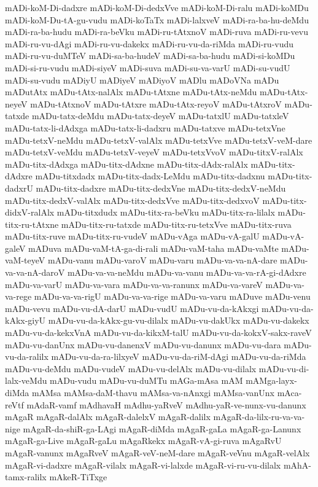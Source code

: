 {mADi-koM-Di-dadxre
mADi-koM-Di-dedxVve
mADi-koM-Di-ralu
mADi-koMDu
mADi-koM-Du-tA-gu-vudu
mADi-koTaTx
mADi-lalxveV
mADi-ra-ba-hu-deMdu
mADi-ra-ba-hudu
mADi-ra-beVku
mADi-ru-tAtxnoV
mADi-ruva
mADi-ru-vevu
mADi-ru-vu-dAgi
mADi-ru-vu-dakekx
mADi-ru-vu-da-riMda
mADi-ru-vudu
mADi-ru-vu-duMTeV
mADi-sa-ba-hudeV
mADi-sa-ba-hudu
mADi-si-koMDu
mADi-si-ru-vudu
mADi-siyeV
mADi-suva
mADi-su-va-varU
mADi-su-vudU
mADi-su-vudu
mADiyU
mADiyeV
mADiyoV
mADlu
mADoVNa
mADu
mADutAtx
mADu-tAtx-nalAlx
mADu-tAtxne
mADu-tAtx-neMdu
mADu-tAtx-neyeV
mADu-tAtxnoV
mADu-tAtxre
mADu-tAtx-reyoV
mADu-tAtxroV
mADu-tatxde
mADu-tatx-deMdu
mADu-tatx-deyeV
mADu-tatxlU
mADu-tatxleV
mADu-tatx-li-dAdxga
mADu-tatx-li-dadxru
mADu-tatxve
mADu-tetxVne
mADu-tetxV-neMdu
mADu-tetxV-valAlx
mADu-tetxVve
mADu-tetxV-veM-dare
mADu-tetxV-veMdu
mADu-tetxV-veyeV
mADu-tetxVvoV
mADu-titxV-ralAlx
mADu-titx-dAdxga
mADu-titx-dAdxne
mADu-titx-dAdx-ralAlx
mADu-titx-dAdxre
mADu-titxdadx
mADu-titx-dadx-LeMdu
mADu-titx-dadxnu
mADu-titx-dadxrU
mADu-titx-dadxre
mADu-titx-dedxVne
mADu-titx-dedxV-neMdu
mADu-titx-dedxV-valAlx
mADu-titx-dedxVve
mADu-titx-dedxvoV
mADu-titx-didxV-ralAlx
mADu-titxdudx
mADu-titx-ra-beVku
mADu-titx-ra-lilalx
mADu-titx-ru-tAtxne
mADu-titx-ru-tatxde
mADu-titx-ru-tetxVve
mADu-titx-ruva
mADu-titx-ruve
mADu-titx-ru-vudeV
mADu-vAga
mADu-vA-galU
mADu-vA-galeV
mADuva
mADu-vaM-tA-ga-di-rali
mADu-vaM-taha
mADu-vaMte
mADu-vaM-teyeV
mADu-vanu
mADu-varoV
mADu-varu
mADu-va-va-nA-dare
mADu-va-va-nA-daroV
mADu-va-va-neMdu
mADu-va-vanu
mADu-va-va-rA-gi-dAdxre
mADu-va-varU
mADu-va-vara
mADu-va-va-ranunx
mADu-va-vareV
mADu-va-va-rege
mADu-va-va-rigU
mADu-va-va-rige
mADu-va-varu
mADuve
mADu-venu
mADu-vevu
mADu-vu-dA-darU
mADu-vudU
mADu-vu-da-kAkxgi
mADu-vu-da-kAkx-giyU
mADu-vu-da-kAkx-gu-vu-dilalx
mADu-vu-dakUkx
mADu-vu-dakekx
mADu-vu-da-kekxVnA
mADu-vu-da-kikxM-talU
mADu-vu-da-kokxV-sakx-raveV
mADu-vu-danUnx
mADu-vu-danenxV
mADu-vu-danunx
mADu-vu-dara
mADu-vu-da-ralilx
mADu-vu-da-ra-lilxyeV
mADu-vu-da-riM-dAgi
mADu-vu-da-riMda
mADu-vu-deMdu
mADu-vudeV
mADu-vu-delAlx
mADu-vu-dilalx
mADu-vu-di-lalx-veMdu
mADu-vudu
mADu-vu-duMTu
mAGa-mAsa
mAM
mAMga-layx-diMda
mAMsa
mAMsa-daM-thavu
mAMsa-va-nAnxgi
mAMsa-vanUnx
mAca-reVtf
mAdaR-vamf
mAdhavaH
mAdhu-yaRveV
mAdhu-yaR-ve-nunx-vu-danunx
mAgaR
mAgaR-dalAlx
mAgaR-dalelxV
mAgaR-dalilx
mAgaR-da-lilx-ru-va-va-nige
mAgaR-da-shiR-ga-LAgi
mAgaR-diMda
mAgaR-gaLa
mAgaR-ga-Lanunx
mAgaR-ga-Live
mAgaR-gaLu
mAgaRkekx
mAgaR-vA-gi-ruva
mAgaRvU
mAgaR-vanunx
mAgaRveV
mAgaR-veV-neM-dare
mAgaR-veVnu
mAgaR-velAlx
mAgaR-vi-dadxre
mAgaR-vilalx
mAgaR-vi-lalxde
mAgaR-vi-ru-vu-dilalx
mAhA-tamx-ralilx
mAkeR-TiTxge
}
